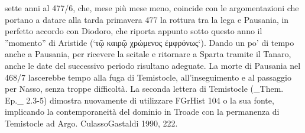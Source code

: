 sette anni al 477/6, che, mese più mese meno, coincide con le argomentazioni che portano a datare alla tarda primavera 477 la rottura tra la lega e Pausania, in perfetto accordo con Diodoro, che riporta appunto sotto questo anno il ''momento'' di Aristide (`τῷ καιρῷ χρώμενος ἐμφρόνως`). Dando un po' di tempo anche a Pausania, per ricevere la scitale e ritornare a Sparta tramite il Tanaro, anche le date del successivo periodo risultano adeguate. La morte di Pausania nel 468/7 lascerebbe tempo alla fuga di Temistocle, all'inseguimento e al passaggio per Nasso, senza troppe difficoltà.
            La seconda lettera di Temistocle (_Them. Ep._  2.3-5) dimostra nuovamente di utilizzare FGrHist 104 o la sua fonte, implicando la contemporaneità del dominio in Troade con la permanenza di Temistocle ad Argo. CulassoGastaldi 1990, 222. 
